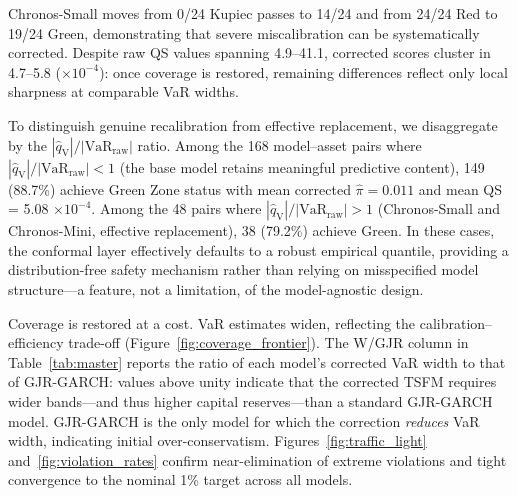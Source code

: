 \documentclass[preprint,11pt,authoryear]{elsarticle}
\newcommand{\VaR}{\mathrm{VaR}}
\newcommand{\1}{\boldsymbol{1}}
\newcommand{\qV}{\hat{q}_{\scriptscriptstyle\mathrm{V}}}
\begin{document}
	Chronos-Small moves from 0/24 Kupiec passes to 14/24 and from
	24/24 Red to 19/24 Green, demonstrating that severe
	miscalibration can be systematically corrected. Despite raw QS
	values spanning 4.9--41.1, corrected scores cluster in
	4.7--5.8 ($\times 10^{-4}$): once coverage is restored,
	remaining differences reflect only local sharpness at
	comparable VaR widths.
	
	To distinguish genuine recalibration from effective
	replacement, we disaggregate by the $|\qV|/|\VaR_{\mathrm{raw}}|$
	ratio. Among the 168 model--asset pairs where
	$|\qV|/|\VaR_{\mathrm{raw}}| < 1$ (the base model retains
	meaningful predictive content), 149 (88.7\%) achieve Green Zone
	status with mean corrected $\hat\pi = 0.011$ and mean
	QS = 5.08 $\times 10^{-4}$. Among the 48 pairs where
	$|\qV|/|\VaR_{\mathrm{raw}}| > 1$ (Chronos-Small and
	Chronos-Mini, effective replacement), 38 (79.2\%) achieve Green.
	In these cases, the conformal layer effectively defaults to a robust empirical quantile, providing a distribution-free safety mechanism rather than relying on misspecified model structure---a feature, not a limitation, of the model-agnostic design.

	Coverage is restored at a cost. VaR estimates widen, reflecting
	the calibration--efficiency trade-off
	(Figure~\ref{fig:coverage_frontier}). The W/GJR column in
	Table~\ref{tab:master} reports the ratio of each model's
	corrected VaR width to that of GJR-GARCH: values above unity
	indicate that the corrected TSFM requires wider bands---and
	thus higher capital reserves---than a standard GJR-GARCH model.
	GJR-GARCH is the only model for which the correction
	\emph{reduces} VaR width, indicating initial over-conservatism.
	Figures~\ref{fig:traffic_light} and~\ref{fig:violation_rates}
	confirm near-elimination of extreme violations and tight
	convergence to the nominal 1\% target across all models.
	
\end{document}

